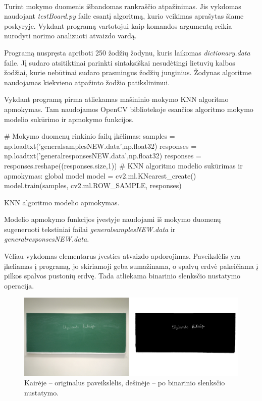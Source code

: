 \documentclass[a4paper,12pt]{article}
\begin{document}
 \paragraph{} Turint mokymo duomenis išbandomas rankraščio atpažinimas. Jis vykdomas naudojant \textit{testBoard.py} faile esantį algoritmą, kurio veikimas aprašytas šiame poskyryje. Vykdant programą vartotojui kaip komandos argumentą reikia nurodyti norimo analizuoti atvaizdo vardą.
 
 Programą nuspręsta apriboti 250 žodžių žodynu, kuris laikomas \textit{dictionary.data} faile. Jį sudaro atsitiktinai parinkti sintaksiškai nesudėtingi lietuvių kalbos žodžiai, kurie nebūtinai sudaro prasmingus žodžių junginius. Žodynas algoritme naudojamas kiekvieno atpažinto žodžio patikslinimui.
 
 Vykdant programą pirma atliekamas mašininio mokymo KNN algoritmo apmokymas. Tam naudojamos OpenCV bibliotekoje esančios algoritmo mokymo modelio sukūrimo ir apmokymo funkcijos.
 \begin{listing}[H]
 	\begin{pythoncode}
# Mokymo duomenų rinkinio failų įkėlimas:
samples = np.loadtxt('generalsamplesNEW.data',np.float32)
responses = np.loadtxt('generalresponsesNEW.data',np.float32)
responses = responses.reshape((responses.size,1))
# KNN algoritmo modelio sukūrimas ir apmokymas:
global model
model = cv2.ml.KNearest_create()
model.train(samples, cv2.ml.ROW_SAMPLE, responses)
 	\end{pythoncode}
 	\caption{KNN algoritmo modelio apmokymas.}	
 \end{listing}
 
Modelio apmokymo funkcijos įvestyje naudojami iš mokymo duomenų sugeneruoti tekstiniai failai \textit{generalsamplesNEW.data} ir \textit{generalresponsesNEW.data}.

Vėliau vykdomas elementarus įvesties atvaizdo apdorojimas. Paveikslėlis yra įkeliamas į programą, jo skiriamoji geba sumažinama, o spalvų erdvė pakeičiama į pilkos spalvos pustonių erdvę. Tada atliekama binarinio slenksčio nustatymo operacija.
		\begin{figure}[H]
			\centering
			\includegraphics[scale=0.4]{images/binarythresh}
			\caption{Kairėje – originalus paveikslėlis, dešinėje – po binarinio slenksčio nustatymo.}   %
			\label{img:binarythresh}
		\end{figure}
\end{document}
